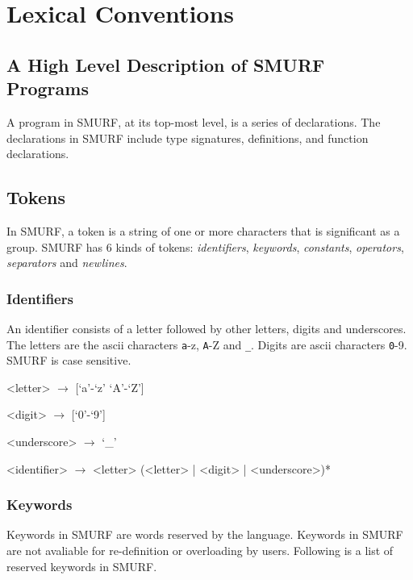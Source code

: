 \section{Lexical Conventions}
\subsection{A High Level Description of SMURF Programs}
A program in SMURF, at its top-most level, is a series of declarations. The declarations in SMURF include type signatures, definitions, and function declarations.

\subsection{Tokens}
In SMURF, a token is a string of one or more characters that is significant as a group.
SMURF has 6 kinds of tokens: {\it identifiers}, {\it keywords}, {\it constants},
      {\it operators},
{\it separators} and {\it newlines}.

\subsubsection{Identifiers}
\label{sec:identifiers}
An identifier consists of a letter followed by other letters, 
digits and underscores. The letters are the ascii characters {\texttt a-z}, {\texttt A-Z} and \texttt{\_}. Digits are ascii
characters {\texttt 0-9}. SMURF is case sensitive.

\begin{grammar}
<letter> $\rightarrow$ [`a'-`z' `A'-`Z'] 

<digit> $\rightarrow$ [`0'-`9'] 

<underscore> $\rightarrow$ {`_'} 

<identifier> $\rightarrow$ <letter> (<letter> | <digit> | <underscore>)*
\end{grammar}

\subsubsection{Keywords}
\label{sec:keywords}
Keywords in SMURF are words reserved by the language. Keywords in SMURF are not avaliable for
re-definition or overloading by users. Following is a list of reserved keywords in SMURF. 

